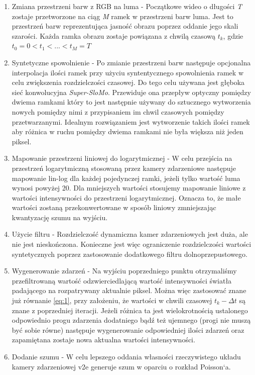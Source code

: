    \begin{enumerate}
       \item Zmiana przestrzeni barw z RGB na luma - Początkowe wideo o długości \emph{T} zostaje przetworzone na ciąg \emph{M} ramek w przestrzeni barw luma.  Jest to przestrzeń barw reprezentująca jasność obrazu poprzez oddanie jego skali szarości. Każda ramka obrazu zostaje powiązana z chwilą czasową \( t_k\), gdzie \( t_0 = 0 < t_1 < ... < t_M = T \)
       
       \item Syntetyczne spowolnienie - Po zmianie przestrzeni barw następuje opcjonalna interpolacja ilości ramek przy użyciu syntentycznego spowolnienia ramek w celu zwiększenia rozdzielczości czasowej. Do tego celu używana jest głęboka sieć konwolucyjna \emph{Super-SloMo}. Przewiduje ona przepływ optyczny pomiędzy dwiema ramkami który to jest następnie używany do sztucznego wytworzenia nowych pomiędzy nimi z przypisaniem im chwil czasowych pomiędzy przetwarzanymi. Idealnym rozwiązaniem jest wytworzenie takich ilości ramek aby różnica w ruchu pomiędzy dwiema ramkami nie była większa niż jeden piksel.
       
       \item Mapowanie przestrzeni liniowej do logarytmicznej - W celu przejścia na przestrzeń logarytmiczną stosowaną przez kamery zdarzeniowe następuje mapowanie lin-log dla każdej pojedynczej ramki, jeżeli tylko wartość luma wynosi powyżej 20. Dla mniejszych wartości stosujemy mapowanie liniowe z wartości intensywności do przestrzeni logarytmicznej. Oznacza to, że małe wartości zostaną przekonwertowane w sposób liniowy zmniejszając kwantyzację szumu na wyjściu.
       
       \item Użycie filtru  - Rozdzielczość dynamiczna kamer zdarzeniowych jest duża, ale nie jest nieskończona. Konieczne jest więc ograniczenie rozdzielczości wartości syntetycznych poprzez zastosowanie dodatkowego filtru dolnoprzepustowego.
       
       \item Wygenerowanie zdarzeń - Na wyjściu poprzedniego punktu otrzymaliśmy przefiltrowaną wartość odzwierciedlającą wartość intensywności 
       światła padającego na rozpatrywany aktualnie piksel. Można więc zastosować znane już równanie \ref{eq:1}, przy założeniu, że wartości w chwili czasowej \( t_k - \Delta t\) są znane z poprzedniej iteracji. Jeżeli różnica ta jest wielokrotnością ustalonego odpowiednio progu zdarzenia dodatniego bądź też ujemnego (progi nie muszą być sobie równe) następuje wygenerowanie odpowiedniej ilości zdarzeń oraz zapamiętana zostaje nowa aktualna wartości intensywności. 
       
       \item Dodanie szumu - W celu lepszego oddania własności rzeczywistego układu kamery zdarzeniowej v2e generuje szum w oparciu o rozkład Poisson`a.
       
   \end{enumerate}
   
